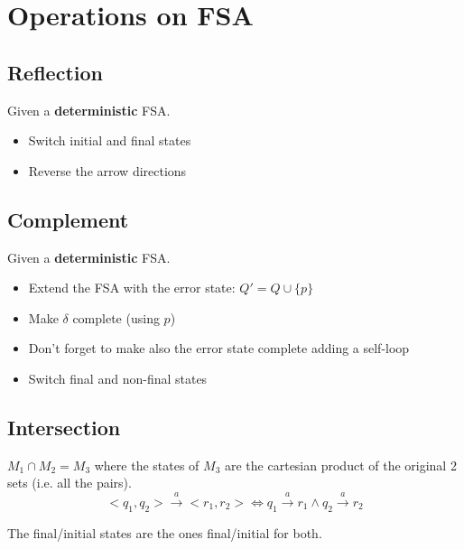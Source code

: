 \section{Operations on FSA}

\subsection{Reflection}
Given a \textbf{deterministic} FSA.
\begin{itemize}
    \item Switch initial and final states
    \item Reverse the arrow directions
\end{itemize}

\subsection{Complement}
Given a \textbf{deterministic} FSA.
\begin{itemize}
    \item Extend the FSA with the error state: $Q' = Q \cup \{p\}$
    \item Make $\delta$ complete (using $p$)
    \item Don't forget to make also the error state complete adding a self-loop
    \item Switch final and non-final states
\end{itemize}

\subsection{Intersection}
$M_1 \cap M_2 = M_3$ where the states of $M_3$ are the cartesian product of the original 2 sets (i.e. all the pairs).
\[
    <q_1, q_2> \xrightarrow{a} <r_1,r_2> \iff q_1\xrightarrow{a} r_1 \land q_2 \xrightarrow{a} r_2
\]

The final/initial states are the ones final/initial for both.
